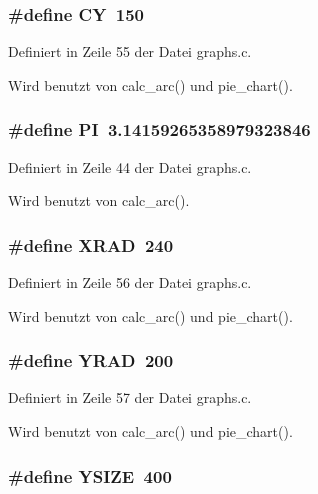 \subsubsection{\setlength{\rightskip}{0pt plus 5cm}\#define CY~150}\label{graphs_8c_c5bc792e372b15e7a1d3efe6daac9aec}




Definiert in Zeile 55 der Datei graphs.c.

Wird benutzt von calc\_\-arc() und pie\_\-chart().
\subsubsection{\setlength{\rightskip}{0pt plus 5cm}\#define PI~3.14159265358979323846}\label{graphs_8c_598a3330b3c21701223ee0ca14316eca}




Definiert in Zeile 44 der Datei graphs.c.

Wird benutzt von calc\_\-arc().
\subsubsection{\setlength{\rightskip}{0pt plus 5cm}\#define XRAD~240}\label{graphs_8c_e1eec295ea8cd8f04c1f24b59110fcae}




Definiert in Zeile 56 der Datei graphs.c.

Wird benutzt von calc\_\-arc() und pie\_\-chart().
\subsubsection{\setlength{\rightskip}{0pt plus 5cm}\#define YRAD~200}\label{graphs_8c_3eeb4d5b339574d992e5ac5b2c5cd8ff}




Definiert in Zeile 57 der Datei graphs.c.

Wird benutzt von calc\_\-arc() und pie\_\-chart().
\subsubsection{\setlength{\rightskip}{0pt plus 5cm}\#define YSIZE~400}\label{graphs_8c_faefa0d521156ca605f526c14d05e272}




